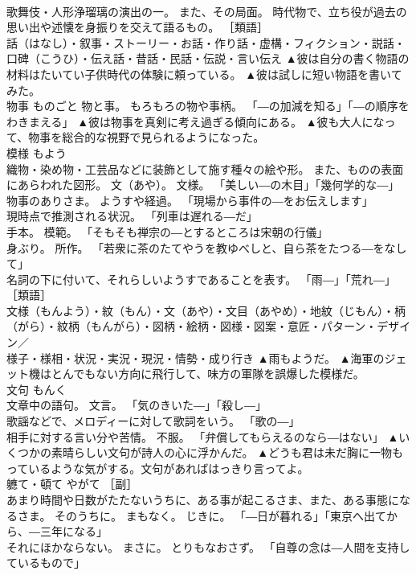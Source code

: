 \documentclass[8pt]{extreport}
\begin{document}
\begin{CJK}{UTF8}{min}
\\	歌舞伎・人形浄瑠璃の演出の一。 また、その局面。 時代物で、立ち役が過去の思い出や述懐を身振りを交えて語るもの。 ［類語］
\\	話（はなし）・叙事・ストーリー・お話・作り話・虚構・フィクション・説話・口碑（こうひ）・伝え話・昔話・民話・伝説・言い伝え	▲彼は自分の書く物語の材料はたいてい子供時代の体験に頼っている。 ▲彼は試しに短い物語を書いてみた。
\\	物事	ものごと	物と事。 もろもろの物や事柄。 「―の加減を知る」「―の順序をわきまえる」	▲彼は物事を真剣に考え過ぎる傾向にある。 ▲彼も大人になって、物事を総合的な視野で見られるようになった。
\\	模様	もよう	
\\	織物・染め物・工芸品などに装飾として施す種々の絵や形。 また、ものの表面にあらわれた図形。 文（あや）。 文様。 「美しい―の木目」「幾何学的な―」 
\\	物事のありさま。 ようすや経過。 「現場から事件の―をお伝えします」 
\\	現時点で推測される状況。 「列車は遅れる―だ」 
\\	手本。 模範。 「そもそも禅宗の―とするところは宋朝の行儀」 
\\	身ぶり。 所作。 「若衆に茶のたてやうを教ゆべしと、自ら茶をたつる―をなして」 
\\	名詞の下に付いて、それらしいようすであることを表す。 「雨―」「荒れ―」 ［類語］
\\	文様（もんよう）・紋（もん）・文（あや）・文目（あやめ）・地紋（じもん）・柄（がら）・紋柄（もんがら）・図柄・絵柄・図様・図案・意匠・パターン・デザイン／
\\	様子・様相・状況・実況・現況・情勢・成り行き	▲雨もようだ。 ▲海軍のジェット機はとんでもない方向に飛行して、味方の軍隊を誤爆した模様だ。
\\	文句	もんく	
\\	文章中の語句。 文言。 「気のきいた―」「殺し―」 
\\	歌謡などで、メロディーに対して歌詞をいう。 「歌の―」 
\\	相手に対する言い分や苦情。 不服。 「弁償してもらえるのなら―はない」	▲いくつかの素晴らしい文句が詩人の心に浮かんだ。 ▲どうも君は未だ胸に一物もっているような気がする。文句があればはっきり言ってよ。
\\	軈て・頓て	やがて	［副］ 
\\	あまり時間や日数がたたないうちに、ある事が起こるさま、また、ある事態になるさま。 そのうちに。 まもなく。 じきに。 「―日が暮れる」「東京へ出てから、―三年になる」 
\\	それにほかならない。 まさに。 とりもなおさず。 「自尊の念は―人間を支持しているもので」 

\end{CJK}
\end{document}
